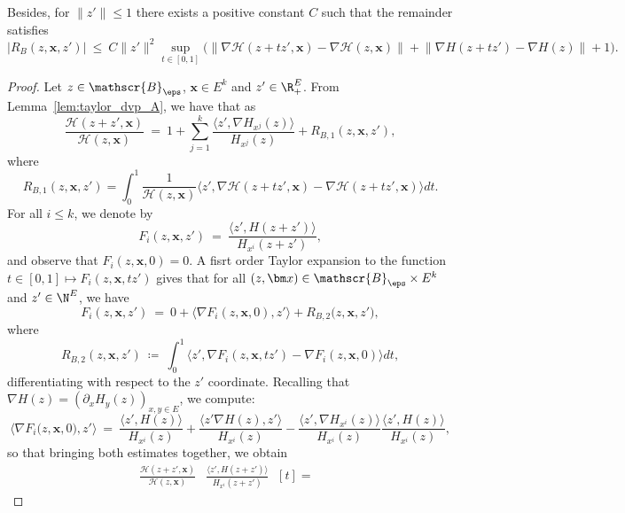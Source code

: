 \begin{refsegment}
\begin{lem}
 Besides, for $\lVert z'\rVert\leq 1$ there exists a positive constant $C$ such that the remainder satisfies 
\begin{equation*}
\big| R_B(z,\bm x, z')\big|\ \leq\ C\lVert z' \rVert^2 \sup_{t\in [0,1]}\Big(\big\lVert \nabla \mathcal{H}(z+tz',\bm x) - \nabla \mathcal{H}(z,\bm x)\big\rVert + \big\lVert \nabla H(z+tz') - \nabla H(z)\big\rVert + 1
 \Big).
\end{equation*}
\end{lem}
\begin{proof}
  Let $z\in \mathscr{B}_\eps$, $\bm x\in E^k$ and $z'\in \R_+^E$.
  From Lemma~\ref{lem:taylor_dvp_A}, we have that as 
  \[
  \frac{\mathcal{H}(z+ z', \bm x)}{\mathcal{H}(z, \bm x)}\ =\ 1+ \sum_{j=1}^k \frac{\langle  z', \nabla H_{x^j}(z)\rangle}{ H_{x^j}(z)}  + R_{B,1}(z,\bm x, z'),
  \]
where 
\begin{equation}\label{Ch4:eq:RB1}
R_{B,1}(z,\bm x, z') = \int_0^1 \frac{1}{\mathcal{H}(z, \bm x)}\big\langle  z', \nabla\mathcal H(z+tz',\bm x) - \nabla\mathcal H(z+tz',\bm x)\big\rangle dt.
\end{equation}
For all $i\leq k$, we denote by
\[ 
F_{i}(z,\bm x, z')\ =\ \frac{\big\langle z', H(z+ z')\big\rangle}{H_{x^i}(z+ z')},
\]
and observe that $F_{i}(z, \bm x , 0)=0$.
A fisrt order Taylor expansion to the function $t\in  [0,1]\mapsto F_{i}(z, \bm x , tz')$ gives that for all $(z,\bm x)\in \mathscr{B}_{\eps}\times E^k$ and $z' \in \N^E$, we have
\[
 F_{i}(z, \bm x , z')\ =\ 0 + \big\langle\nabla F_{i}(z, \bm x, 0), z'\big\rangle + R_{B,2}\big(z, \bm x, z'),
\]
where
\begin{equation}\label{Ch4:eq:RB2}
R_{B,2}(z, \bm x,  z')\ \coloneqq\ \int_0^1 \big\langle z', \nabla F_i(z,\bm x, tz') - \nabla F_i(z,\bm x, 0) \big\rangle dt,
\end{equation}
 differentiating with respect to the $z'$ coordinate.
Recalling that $\nabla H(z)=(\partial_x H_y(z))_{x,y\in E}$, we compute:
\[
\big\langle \nabla F_i(z,\bm x, 0\big), z'\big\rangle\ =\ \frac{\langle z' ,H(z)\rangle}{H_{x^i}(z)} +  \frac{\langle z'\nabla H(z), z'\rangle}{H_{x^i}(z)} - \frac{\langle z',\nabla H_{x^i}(z)\rangle}{H_{x^i}(z)}\frac{\langle z' ,H(z)\rangle}{H_{x^i}(z)},
\]
so that bringing both estimates together, we obtain
\begin{align*}
\frac{\mathcal{H}(z+ z', \bm x)}{\mathcal{H}(z, \bm x)}&\frac{\big\langle z' , H(z+ z')\big\rangle}{H_{x^i}(z+ z')}
\ \begin{multlined}[t]=\  

\end{multlined}
\end{align*}
\end{proof}
\end{refsegment}
